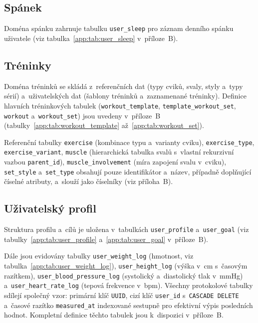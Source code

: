 \subsection{Spánek}
Doména spánku zahrnuje tabulku \texttt{user\_sleep} pro záznam denního spánku uživatele (viz tabulka~\ref{app:tab:user_sleep} v~příloze~B).

\subsection{Tréninky}
Doména tréninků se skládá z~referenčních dat (typy cviků, svaly, styly a~typy sérií) a~uživatelských dat (šablony tréninků a~zaznamenané tréninky). Definice hlavních tréninkových tabulek (\texttt{workout\_template}, \texttt{template\_workout\_set}, \texttt{workout} a~\texttt{workout\_set}) jsou uvedeny v~příloze~B (tabulky~\ref{app:tab:workout_template} až~\ref{app:tab:workout_set}).

{\sloppy
Referenční tabulky \texttt{exercise} (kombinace typu a~varianty cviku), \texttt{exercise\_}\allowbreak\texttt{type}, \texttt{exercise\_}\allowbreak\texttt{variant}, \texttt{muscle} (hierarchická tabulka svalů s~vlastní rekurzivní vazbou \texttt{parent\_}\allowbreak\texttt{id}), \texttt{muscle\_}\allowbreak\texttt{involvement} (míra zapojení svalu v~cviku), \texttt{set\_}\allowbreak\texttt{style} a~\texttt{set\_}\allowbreak\texttt{type} obsahují pouze identifikátor a~název, případně doplňující číselné atributy, a~slouží jako číselníky (viz příloha~B).
}

\subsection{Uživatelský profil}
{\sloppy
Struktura profilu a~cílů je uložena v~tabulkách \texttt{user\_profile} a~\texttt{user\_goal} (viz tabulky~\ref{app:tab:user_profile} a~\ref{app:tab:user_goal} v~příloze~B).

Dále jsou evidovány tabulky \texttt{user\_weight\_log} (hmotnost, viz tabulka~\ref{app:tab:user_weight_log}), \texttt{user\_}\allowbreak\texttt{height\_}\allowbreak\texttt{log} (výška v~cm s~časovým razítkem), \texttt{user\_}\allowbreak\texttt{blood\_}\allowbreak\texttt{pressure\_}\allowbreak\texttt{log} (systolický a~diastolický tlak v~mmHg) a~\texttt{user\_}\allowbreak\texttt{heart\_}\allowbreak\texttt{rate\_}\allowbreak\texttt{log} (tepová frekvence v~bpm). Všechny protokolové tabulky sdílejí společný vzor: primární klíč \texttt{UUID}, cizí klíč \texttt{user\_id} s~\texttt{CASCADE DELETE} a~časové razítko \texttt{measured\_at} indexované sestupně pro efektivní výpis posledních hodnot. Kompletní definice těchto tabulek jsou k~dispozici v~příloze~B.
}


